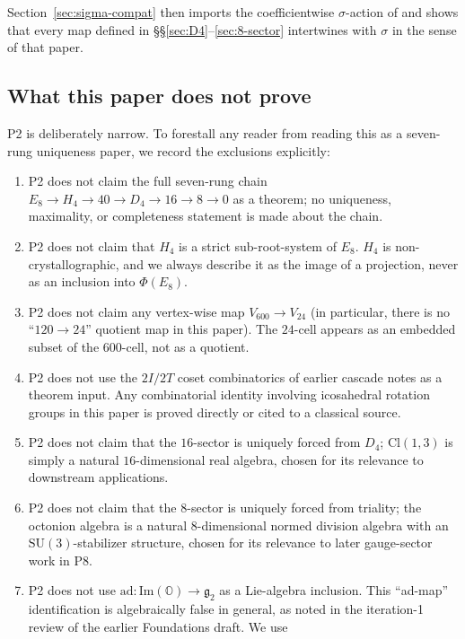 \documentclass[11pt, a4paper]{amsart}
\theoremstyle{definition}
\newcommand{\OO}{\mathbb{O}}
\newcommand{\Cl}{\mathrm{Cl}}
\newcommand{\SU}{\mathrm{SU}}
\renewcommand{\Im}{\mathrm{Im}}
\begin{document}
Section~\ref{sec:sigma-compat} then imports the coefficientwise
$\sigma$-action of \cite{SigmaRationality} and shows that every map
defined in \S\S\ref{sec:D4}--\ref{sec:8-sector} intertwines with
$\sigma$ in the sense of that paper.

\subsection{What this paper does not prove}

P2 is deliberately narrow. To forestall any reader from reading
this as a seven-rung uniqueness paper, we record the exclusions
explicitly:

\begin{enumerate}
\item P2 does not claim the full seven-rung chain
  $E_8 \to H_4 \to 40 \to D_4 \to 16 \to 8 \to 0$ as a theorem; no
  uniqueness, maximality, or completeness statement is made about
  the chain.
\item P2 does not claim that $H_4$ is a strict sub-root-system of
  $E_8$. $H_4$ is non-crystallographic, and we always describe it
  as the image of a projection, never as an inclusion into
  $\Phi(E_8)$.
\item P2 does not claim any vertex-wise map $V_{600} \to V_{24}$
  (in particular, there is no ``$120 \to 24$'' quotient map in this
  paper). The $24$-cell appears as an embedded subset of the
  $600$-cell, not as a quotient.
\item P2 does not use the $2I/2T$ coset combinatorics of earlier
  cascade notes as a theorem input. Any combinatorial identity
  involving icosahedral rotation groups in this paper is proved
  directly or cited to a classical source.
\item P2 does not claim that the $16$-sector is uniquely forced
  from $D_4$; $\Cl(1,3)$ is simply a natural $16$-dimensional real
  algebra, chosen for its relevance to downstream applications.
\item P2 does not claim that the $8$-sector is uniquely forced
  from triality; the octonion algebra is a natural $8$-dimensional
  normed division algebra with an $\SU(3)$-stabilizer structure,
  chosen for its relevance to later gauge-sector work in P8.
\item P2 does not use $\mathrm{ad} \colon \Im(\OO) \to
  \mathfrak{g}_2$ as a Lie-algebra inclusion. This ``ad-map''
  identification is algebraically false in general, as noted in the
  iteration-1 review of the earlier Foundations draft. We use

\end{enumerate}
\end{document}
